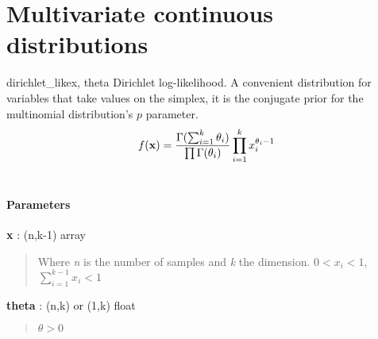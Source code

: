 \section{Multivariate continuous distributions}

\hypertarget{pymc.distributions.dirichlet_like}{}
\begin{funcdesc}{dirichlet\_like}{x, theta}
Dirichlet log-likelihood. A convenient distribution for variables that take values on the simplex, it is the conjugate prior for the multinomial distribution's $p$ parameter.
\begin{gather}
\begin{split}f(\mathbf{x}) = \frac{\Gamma(\sum_{i=1}^k \theta_i)}{\prod \Gamma(\theta_i)} \prod_{i=1}^k x_i^{\theta_i - 1}\end{split}\notag\\\begin{split}\end{split}\notag
\end{gather}\paragraph{Parameters}\begin{paramlist}

\item[] \textbf{x} : (n,k-1) array
\begin{quote}

Where \emph{n} is the number of samples and \emph{k} the dimension.
$0 < x_i < 1$,  $\sum_{i=1}^{k-1} x_i < 1$
\end{quote}

\item[] \textbf{theta} : (n,k) or (1,k) float
\begin{quote}

$\theta > 0$
\end{quote}
\end{paramlist}
\end{funcdesc}

